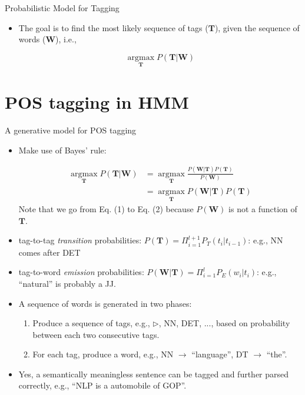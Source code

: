 \documentclass[11pt]{beamer}
\newcommand{\argmaxF}{\mathop{\mathrm{argmax}}\limits}
\begin{document}
\begin{frame}{Probabilistic Model for Tagging}
\begin{itemize}[<+->]
\item 
The goal is to find the most likely sequence of tags ($\mathbf{T}$), given the sequence of words ($\mathbf{W}$), i.e., 

$$
\argmaxF_\mathbf{T}  P(\mathbf{T}|\mathbf{W})
$$

\end{itemize}

\end{frame}


\section{POS tagging in HMM}

\begin{frame}{A generative model for POS tagging}
\begin{itemize}[<+->]


 \item Make use of Bayes' rule:

 \begin{align}
\argmaxF_\mathbf{T}  P(\mathbf{T}|\mathbf{W}) &= \argmaxF_\mathbf{T} \frac{P(\mathbf{W}|\mathbf{T}) P(\mathbf{T}) }{P(\mathbf{W})}  \\
       &= \argmaxF_\mathbf{T} P(\mathbf{W}|\mathbf{T}) P(\mathbf{T}) 
\end{align}
{\tiny Note that we go from Eq. (1) to Eq. (2) because $P(\mathbf{W})$ is not a function of $\mathbf{T}$.}

 \item tag-to-tag \textit{transition} probabilities: $P(\mathbf{T}) = \Pi_{i=1}^{l+1} P_T(t_i | t_{i-1}) $: e.g., NN comes after DET
 \item tag-to-word \textit{emission} probabilities: $P(\mathbf{W}|\mathbf{T}) = \Pi_{i=1}^{l} P_E(w_i|t_i) $: e.g., ``natural'' is probably a JJ.

 \item A sequence of words is generated in two phases:
 \begin{enumerate}
  \item Produce a sequence of tags, e.g., $\rhd$, NN, DET, ..., based on probability between each two consecutive tags. 
  \item For each tag, produce a word, e.g., NN $\rightarrow$ ``language'', DT $\rightarrow$ ``the''. 
 \end{enumerate}

  \item Yes, a semantically meaningless sentence can be tagged and further parsed correctly,  e.g., ``NLP is a automobile of GOP''.
\end{itemize}
\end{frame}
\end{document}

